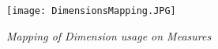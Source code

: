 \begin{figure}
\texttt{[image: DimensionsMapping.JPG]}
\caption{\emph{Mapping of Dimension usage on Measures}} \label{fig1}
\end{figure}
